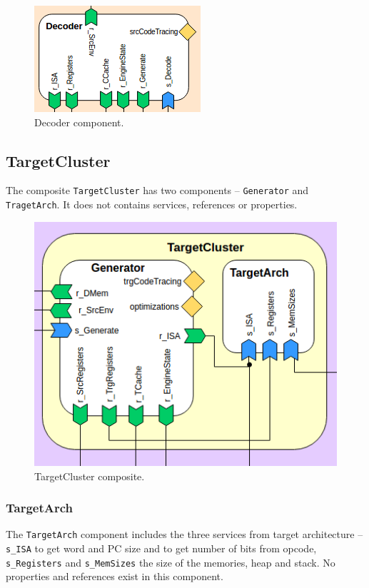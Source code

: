 \documentclass[11pt]{report}
\begin{document}
			\begin{figure} [H]
				\centering
				\includegraphics[width=0.45\linewidth]{Images/arch-ref/Decoder}
				\caption{Decoder component.}
				\label{fig:Decoder}
			\end{figure}			
		
		
		\subsection{TargetCluster}
		
		\par The composite \texttt{TargetCluster} has two components -- \texttt{Generator} and \texttt{TragetArch}. It does not contains services, references or properties.
		
		\begin{figure} [H]
			\centering
			\includegraphics[width=0.6\linewidth]{Images/arch-ref/TargetCluster}
			\caption{TargetCluster composite.}
			\label{fig:TargetCluster}
		\end{figure}
		
			\subsubsection{TargetArch}
			
			\par The \texttt{TargetArch} component includes the three services from target architecture -- \texttt{s\_ISA} to get word and PC size and to get number of bits from opcode, \texttt{s\_Registers} and \texttt{s\_MemSizes} the size of the memories, heap and stack. No properties and references exist in this component.
			
\end{document}
